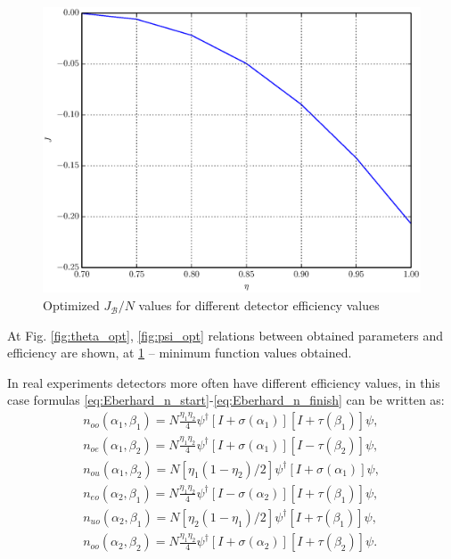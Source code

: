 \documentclass[%
master,         %
subf,           %
href,           %
colorlinks=true %
]{disser}
\numberwithin{equation}{section}
\numberwithin{figure}{section}
\begin{document}
\begin{figure}[h]
\includegraphics[scale=0.7]{J.eps}
\caption{Optimized $J_{\mathcal{B}}/N$ values for different detector efficiency values}
\label{fig:J_opt}
\end{figure}

At Fig. \ref{fig:theta_opt}, \ref{fig:psi_opt} relations between obtained parameters and efficiency 
are shown, at \ref{fig:J_opt} -- minimum function values obtained.

\clearpage

In real experiments detectors more often have different efficiency values, in this case 
formulas \eqref{eq:Eberhard_n_start}-\eqref{eq:Eberhard_n_finish} can be written as:
\begin{eqnarray*}
n_{oo}(\alpha_1, \beta_1) = N\frac{\eta_1\eta_2}{4}\psi^\dagger[I + \sigma(\alpha_1)][I + \tau(\beta_1)]\psi,\\
n_{oe}(\alpha_1, \beta_2) = N\frac{\eta_1\eta_2}{4}\psi^\dagger[I + \sigma(\alpha_1)][I - \tau(\beta_2)]\psi,\\
n_{ou}(\alpha_1, \beta_2) = N[\eta_1(1 - \eta_2)/2]\psi^\dagger[I + \sigma(\alpha_1)]\psi,\\
n_{eo}(\alpha_2, \beta_1) = N\frac{\eta_1\eta_2}{4}\psi^\dagger[I - \sigma(\alpha_2)][I + \tau(\beta_1)]\psi,\\
n_{uo}(\alpha_2, \beta_1) = N[\eta_2(1 - \eta_1)/2]\psi^\dagger[I + \tau(\beta_1)]\psi,\\
n_{oo}(\alpha_2, \beta_2) = N\frac{\eta_1\eta_2}{4}\psi^\dagger[I + \sigma(\alpha_2)][I + \tau(\beta_2)]\psi.
\end{eqnarray*}
\end{document}
